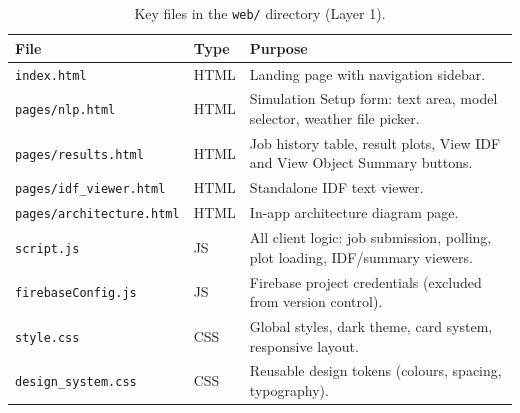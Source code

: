 \documentclass[12pt, a4paper]{article}
\begin{document}
\begin{table}[h!]
\centering
\caption{Key files in the \texttt{web/} directory (Layer 1).}
\label{tab:web}
\small
\begin{tabular}{@{}llp{7.0cm}@{}}
\toprule
\textbf{File} & \textbf{Type} & \textbf{Purpose} \\
\midrule
\texttt{index.html}          & HTML  & Landing page with navigation sidebar. \\
\texttt{pages/nlp.html}      & HTML  & Simulation Setup form: text area, model selector, weather file picker. \\
\texttt{pages/results.html}  & HTML  & Job history table, result plots, View IDF and View Object Summary buttons. \\
\texttt{pages/idf\_viewer.html} & HTML & Standalone IDF text viewer. \\
\texttt{pages/architecture.html} & HTML & In-app architecture diagram page. \\
\texttt{script.js}           & JS    & All client logic: job submission, polling, plot loading, IDF/summary viewers. \\
\texttt{firebaseConfig.js}   & JS    & Firebase project credentials (excluded from version control). \\
\texttt{style.css}           & CSS   & Global styles, dark theme, card system, responsive layout. \\
\texttt{design\_system.css}  & CSS   & Reusable design tokens (colours, spacing, typography). \\
\bottomrule
\end{tabular}
\end{table}
\end{document}
